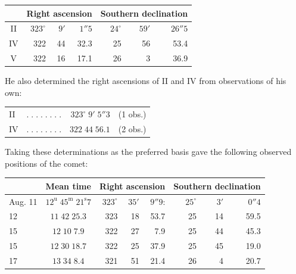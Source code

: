 \begin{center}\fontsize{10}{12}\selectfont\setlength{\tabcolsep}{4pt}\renewcommand{\arraystretch}{1.15}\begin{tabular}{c|rrr|rrr}
& \multicolumn{3}{c|}{Right ascension} & \multicolumn{3}{c}{Southern declination}\\\hline
II & $323^\circ$ & $9'$ & $1''5$ & $24^\circ$ & $59'$ & $26''5$\\
IV & 322 & 44 & 32.3 & 25 & 56 & 53.4\\
V & 322 & 16 & 17.1 & 26 & 3 & 36.9\\
\end{tabular}\end{center}

\par\indent He also determined the right ascensions of II and IV from observations of his own:

\begin{center}\fontsize{10}{12}\selectfont\setlength{\tabcolsep}{4pt}\renewcommand{\arraystretch}{1.15}\begin{tabular}{lcrl}
II & $.\;.\;.\;.\;.\;.\;.\;.$ & $323^\circ\;9'\;5''3$ & (1 obs.)\\
IV & $.\;.\;.\;.\;.\;.\;.\;.$ & $322\;44\;56.1$ & (2 obs.)\\
\end{tabular}\end{center}

\par\indent Taking these determinations as the preferred basis gave the following observed positions of the comet:

\begin{center}\fontsize{9}{11}\selectfont\setlength{\tabcolsep}{3pt}\renewcommand{\arraystretch}{1.15}\begin{tabular}{l|c|rrr|rrr}
& Mean time & \multicolumn{3}{c|}{Right ascension} & \multicolumn{3}{c}{Southern declination}\\\hline
Aug. 11 & $12^{\mathrm u}\;45^{\mathrm m}\;21^{\mathrm s}7$ & $323^\circ$ & $35'$ & $9''9$: & $25^\circ$ & $3'$ & $0''4$\\
12 & $11\;42\;25.3$ & 323 & 18 & 53.7 & 25 & 14 & 59.5\\
15 & $12\;10\;7.9$ & 322 & 27 & 7.9 & 25 & 44 & 45.3\\
15 & $12\;30\;18.7$ & 322 & 25 & 37.9 & 25 & 45 & 19.0\\
17 & $13\;34\;8.4$ & 321 & 51 & 21.4 & 26 & 4 & 20.7\\
\end{tabular}\end{center}


